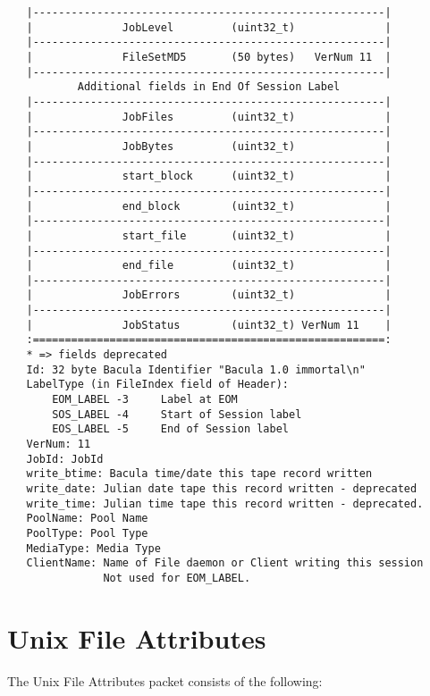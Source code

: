 \begin{verbatim}
   |-------------------------------------------------------|
   |              JobLevel         (uint32_t)              |
   |-------------------------------------------------------|
   |              FileSetMD5       (50 bytes)   VerNum 11  |
   |-------------------------------------------------------|
           Additional fields in End Of Session Label
   |-------------------------------------------------------|
   |              JobFiles         (uint32_t)              |
   |-------------------------------------------------------|
   |              JobBytes         (uint32_t)              |
   |-------------------------------------------------------|
   |              start_block      (uint32_t)              |
   |-------------------------------------------------------|
   |              end_block        (uint32_t)              |
   |-------------------------------------------------------|
   |              start_file       (uint32_t)              |
   |-------------------------------------------------------|
   |              end_file         (uint32_t)              |
   |-------------------------------------------------------|
   |              JobErrors        (uint32_t)              |
   |-------------------------------------------------------|
   |              JobStatus        (uint32_t) VerNum 11    |
   :=======================================================:
   * => fields deprecated
   Id: 32 byte Bacula Identifier "Bacula 1.0 immortal\n"
   LabelType (in FileIndex field of Header):
       EOM_LABEL -3     Label at EOM
       SOS_LABEL -4     Start of Session label
       EOS_LABEL -5     End of Session label
   VerNum: 11
   JobId: JobId
   write_btime: Bacula time/date this tape record written
   write_date: Julian date tape this record written - deprecated
   write_time: Julian time tape this record written - deprecated.
   PoolName: Pool Name
   PoolType: Pool Type
   MediaType: Media Type
   ClientName: Name of File daemon or Client writing this session
               Not used for EOM_LABEL.
\end{verbatim}
\normalsize

\section{Unix File Attributes}

The Unix File Attributes packet consists of the following: 

